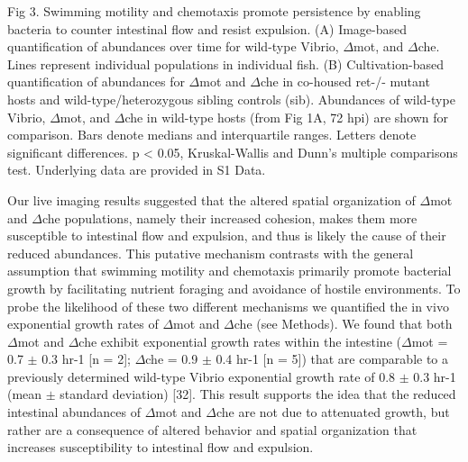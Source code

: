 Fig 3. Swimming motility and chemotaxis promote persistence by enabling bacteria to counter intestinal flow and resist expulsion. 
(A) Image-based quantification of abundances over time for wild-type Vibrio, $\Delta$mot, and $\Delta$che. Lines represent individual populations in individual fish. (B) Cultivation-based quantification of abundances for $\Delta$mot and $\Delta$che in co-housed ret-/- mutant hosts and wild-type/heterozygous sibling controls (sib). Abundances of wild-type Vibrio, $\Delta$mot, and $\Delta$che in wild-type hosts (from Fig 1A, 72 hpi) are shown for comparison. Bars denote medians and interquartile ranges. Letters denote significant differences. p < 0.05, Kruskal-Wallis and Dunn's multiple comparisons test. Underlying data are provided in S1 Data.

Our live imaging results suggested that the altered spatial organization of $\Delta$mot and $\Delta$che populations, namely their increased cohesion, makes them more susceptible to intestinal flow and expulsion, and thus is likely the cause of their reduced abundances. This putative mechanism contrasts with the general assumption that swimming motility and chemotaxis primarily promote bacterial growth by facilitating nutrient foraging and avoidance of hostile environments. To probe the likelihood of these two different mechanisms we quantified the in vivo exponential growth rates of $\Delta$mot and $\Delta$che (see Methods). We found that both $\Delta$mot and $\Delta$che exhibit exponential growth rates within the intestine ($\Delta$mot = 0.7 $\pm$ 0.3 hr-1 [n = 2]; $\Delta$che = 0.9 $\pm$ 0.4 hr-1 [n = 5]) that are comparable to a previously determined wild-type Vibrio exponential growth rate of 0.8 $\pm$ 0.3 hr-1 (mean $\pm$ standard deviation) [32]. This result supports the idea that the reduced intestinal abundances of $\Delta$mot and $\Delta$che are not due to attenuated growth, but rather are a consequence of altered behavior and spatial organization that increases susceptibility to intestinal flow and expulsion. 

